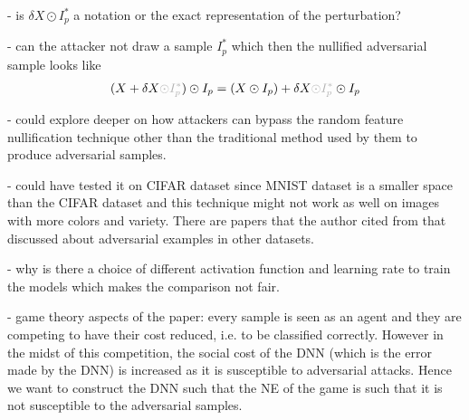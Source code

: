 \documentclass[a4paper,10pt]{article}
\theoremstyle{definition}
\begin{document}
- is $\delta X \odot I_p^\ast$ a notation or the exact representation of the perturbation?

- can the attacker not draw a sample $I_p^\ast$ which then the nullified adversarial sample looks like
\begin{align*}
(X+\delta X {\color{black!30}\odot I_p^\ast}) \odot I_p = (X \odot I_p) + \delta X {\color{black!30}\odot I_p^\ast} \odot I_p
\end{align*}


- could explore deeper on how attackers can bypass the random feature nullification technique other than the traditional method used by them to produce adversarial samples.

- could have tested it on CIFAR dataset since MNIST dataset is a smaller space than the CIFAR dataset and this technique might not work as well on images with more colors and variety. There are papers that the author cited from that discussed about adversarial examples in other datasets.

- why is there a choice of different activation function and learning rate to train the models which makes the comparison not fair.

- game theory aspects of the paper: every sample is seen as an agent and they are competing to have their cost reduced, i.e. to be classified correctly. However in the midst of this competition, the social cost of the DNN (which is the error made by the DNN) is increased as it is susceptible to adversarial attacks. Hence we want to construct the DNN such that the NE of the game is such that it is not susceptible to the adversarial samples.


\newpage

 

\end{document}
